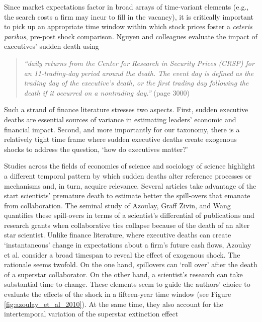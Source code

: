 \documentclass[11pt]{article}
\begin{document}
\begin{refsection}
Since market expectations factor in broad arrays of time-variant elements (e.g., the search costs a firm may incur to fill in the vacancy), it is critically important to pick up an appropriate time window within which stock prices foster a \textit{ceteris paribus}, pre-post shock comparison. Nguyen and colleagues \autocite*[][]{nguyen_et_al_2014} evaluate the impact of executives' sudden death using 

\begin{quote}
  \textit{
    ``daily returns from the Center for Research in Security Prices (CRSP) for
    an 11-trading-day period around the death. The event day is defined as the
    trading day of the executive's death, or the first trading day following
    the death if it occurred on a nontrading day.''
  }
  (page 3000)
\end{quote}

Such a strand of finance literature stresses two aspects. First, sudden executive deaths are essential sources of variance in estimating leaders' economic and financial impact.  Second, and more importantly for our taxonomy, there is a relatively tight time frame where sudden executive deaths create exogenous shocks to address the question, `how do executives matter?'

Studies across the fields of economics of science and sociology of science highlight a different temporal pattern by which sudden deaths alter reference processes or mechanisms and, in turn, acquire relevance. Several articles \autocites[e.g.,][]{azoulay_et_al_2019_b,azoulay_et_al_2019_a,khanna_et_al_2021, aizenam_kletzer_2011,azoulay_et_al_2010,oettl_2012} take advantage of the start scientists' premature death to estimate better the spill-overs that emanate from collaboration. The seminal study of Azoulay, Graff Zivin, and Wang  \autocite*{azoulay_et_al_2010} quantifies these spill-overs in terms of a scientist's differential of publications and research grants when collaborative ties collapse because of the death of an alter star scientist. Unlike finance literature, where executive deaths can create `instantaneous' change in expectations about a firm's future cash flows, Azoulay et al. \autocite*{azoulay_et_al_2010} consider a broad timespan to reveal the effect of exogenous shock. The rationale seems twofold.
On the one hand, spillovers can `roll over' after the death of a superstar collaborator.  On the other hand, a scientist's research can take substantial time to change.  These elements seem to guide the authors' choice to evaluate the effects of the shock in a fifteen-year time window (see Figure \ref{fig:azoulay_et_al_2010}). At the same time, they also account for the intertemporal variation of the superstar extinction effect


\end{refsection}
\end{document}
